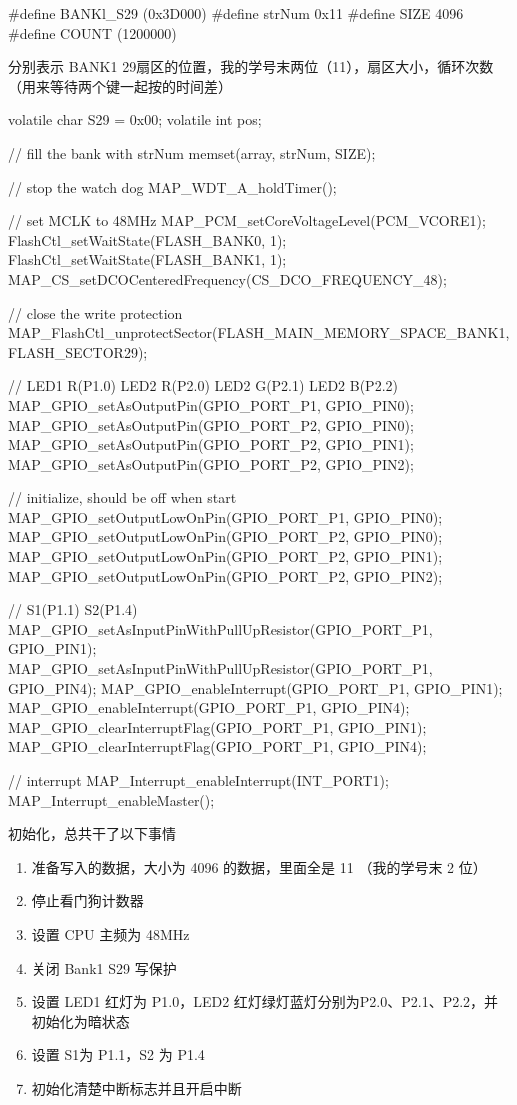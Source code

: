 \documentclass[a4paper,10pt,UTF8]{paper}
\numberwithin{equation}{section}
\numberwithin{figure}{section}
\begin{document}
\begin{ccode}
  #define BANKl_S29 (0x3D000)
  #define strNum 0x11
  #define SIZE 4096
  #define COUNT (1200000)
\end{ccode}

分别表示 BANK1 29扇区的位置，我的学号末两位（11），扇区大小，循环次数（用来等待两个键一起按的时间差）

\begin{ccode}
  volatile char S29 = 0x00;
  volatile int pos;

  // fill the bank with strNum
  memset(array, strNum, SIZE);

  // stop the watch dog
  MAP_WDT_A_holdTimer();

  // set MCLK to 48MHz
  MAP_PCM_setCoreVoltageLevel(PCM_VCORE1);
  FlashCtl_setWaitState(FLASH_BANK0, 1);
  FlashCtl_setWaitState(FLASH_BANK1, 1);
  MAP_CS_setDCOCenteredFrequency(CS_DCO_FREQUENCY_48);

  // close the write protection
  MAP_FlashCtl_unprotectSector(FLASH_MAIN_MEMORY_SPACE_BANK1,
   FLASH_SECTOR29);

  // LED1 R(P1.0) LED2 R(P2.0) LED2 G(P2.1) LED2 B(P2.2)
  MAP_GPIO_setAsOutputPin(GPIO_PORT_P1, GPIO_PIN0);
  MAP_GPIO_setAsOutputPin(GPIO_PORT_P2, GPIO_PIN0);
  MAP_GPIO_setAsOutputPin(GPIO_PORT_P2, GPIO_PIN1);
  MAP_GPIO_setAsOutputPin(GPIO_PORT_P2, GPIO_PIN2);

  // initialize, should be off when start
  MAP_GPIO_setOutputLowOnPin(GPIO_PORT_P1, GPIO_PIN0);
  MAP_GPIO_setOutputLowOnPin(GPIO_PORT_P2, GPIO_PIN0);
  MAP_GPIO_setOutputLowOnPin(GPIO_PORT_P2, GPIO_PIN1);
  MAP_GPIO_setOutputLowOnPin(GPIO_PORT_P2, GPIO_PIN2);

  // S1(P1.1) S2(P1.4)
  MAP_GPIO_setAsInputPinWithPullUpResistor(GPIO_PORT_P1, GPIO_PIN1);
  MAP_GPIO_setAsInputPinWithPullUpResistor(GPIO_PORT_P1, GPIO_PIN4);
  MAP_GPIO_enableInterrupt(GPIO_PORT_P1, GPIO_PIN1);
  MAP_GPIO_enableInterrupt(GPIO_PORT_P1, GPIO_PIN4);
  MAP_GPIO_clearInterruptFlag(GPIO_PORT_P1, GPIO_PIN1);
  MAP_GPIO_clearInterruptFlag(GPIO_PORT_P1, GPIO_PIN4);

  // interrupt
  MAP_Interrupt_enableInterrupt(INT_PORT1);
  MAP_Interrupt_enableMaster();
\end{ccode}

初始化，总共干了以下事情

\begin{enumerate}
  \item 准备写入的数据，大小为 4096 的数据，里面全是 11 （我的学号末 2 位）
  \item 停止看门狗计数器
  \item 设置 CPU 主频为 48MHz
  \item 关闭 Bank1 S29 写保护
  \item 设置 LED1 红灯为 P1.0，LED2 红灯绿灯蓝灯分别为P2.0、P2.1、P2.2，并初始化为暗状态
  \item 设置 S1为 P1.1，S2 为 P1.4
  \item 初始化清楚中断标志并且开启中断
\end{enumerate}
\end{document}
